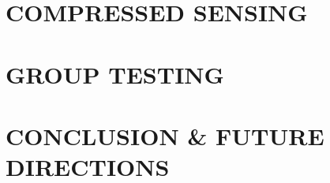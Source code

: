 \documentclass[12pt]{report}
\begin{document}
\chapter{COMPRESSED SENSING}
\label{chap:cs}


\chapter{GROUP TESTING}
\label{chap:gt}


\chapter{\uppercase{ Conclusion \& Future Directions}}
\label{chap:conclusion}


\let\oldbibitem\bibitem
\renewcommand{\bibitem}{\setlength{\itemsep}{0pt}\oldbibitem}

{}
\renewcommand{\bibname}{{\normalsize\rm REFERENCES}}



%
\end{document}
